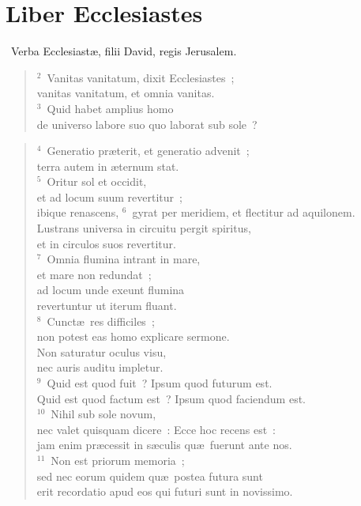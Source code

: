 {\centering \section*{Liber Ecclesiastes}}\thispagestyle{empty}

~\lettrine[lines=10,image=true,loversize=0.05,lraise=-0.03]{V}{}erba Ecclesiast\ae , filii David, regis Jerusalem.
\begin{flushleft}\begin{verse}\vspace{6pt}${}^{2}$~Vanitas vanitatum, dixit Ecclesiastes~;\\ vanitas vanitatum, et omnia vanitas.\\
${}^{3}$~Quid habet amplius homo\\ de universo labore suo quo laborat sub sole~?\end{verse}\end{flushleft}


\begin{flushleft}\begin{verse}${}^{4}$~Generatio pr\ae terit, et generatio advenit~;\\ terra autem in \ae ternum stat.\\
${}^{5}$~Oritur sol et occidit,\\ et ad locum suum revertitur~;\\ ibique renascens,
${}^{6}$~gyrat per meridiem, et flectitur ad aquilonem.\\ Lustrans universa in circuitu pergit spiritus,\\ et in circulos suos revertitur.\\
${}^{7}$~Omnia flumina intrant in mare,\\ et mare non redundat~;\\ ad locum unde exeunt flumina\\ revertuntur ut iterum fluant.\\
${}^{8}$~Cunct\ae\ res difficiles~;\\ non potest eas homo explicare sermone.\\ Non saturatur oculus visu,\\ nec auris auditu impletur.\\
${}^{9}$~Quid est quod fuit~? Ipsum quod futurum est.\\ Quid est quod factum est~? Ipsum quod faciendum est.\\
${}^{10}$~Nihil sub sole novum,\\ nec valet quisquam dicere~: Ecce hoc recens est~:\\ jam enim pr\ae cessit in s\ae culis qu\ae\ fuerunt ante nos.\\
${}^{11}$~Non est priorum memoria~;\\ sed nec eorum quidem qu\ae\ postea futura sunt\\ erit recordatio apud eos qui futuri sunt in novissimo.\end{verse}\end{flushleft}


